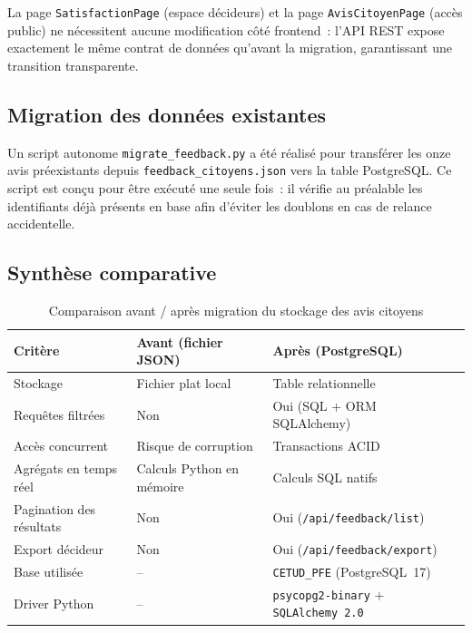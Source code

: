La page \texttt{SatisfactionPage} (espace d\'ecideurs) et la page \texttt{AvisCitoyenPage} (acc\`es public) ne n\'ecessitent aucune modification c\^ot\'e frontend~: l'API REST expose exactement le m\^eme contrat de donn\'ees qu'avant la migration, garantissant une transition transparente.

\subsection{Migration des donn\'ees existantes}

Un script autonome \texttt{migrate\_feedback.py} a \'et\'e r\'ealis\'e pour transf\'erer les onze avis pr\'eexistants depuis \texttt{feedback\_citoyens.json} vers la table PostgreSQL. Ce script est con\c{c}u pour \^etre ex\'ecut\'e une seule fois~: il v\'erifie au pr\'ealable les identifiants d\'ej\`a pr\'esents en base afin d'\'eviter les doublons en cas de relance accidentelle.

\subsection{Synth\`ese comparative}

\begin{table}[H]
\centering
\caption{Comparaison avant / apr\`es migration du stockage des avis citoyens}
\label{tab:feedback-avant-apres}
\begin{tabular}{|l|l|l|}
\hline
\textbf{Crit\`ere} & \textbf{Avant (fichier JSON)} & \textbf{Apr\`es (PostgreSQL)} \\
\hline
Stockage & Fichier plat local & Table relationnelle \\
Requ\^etes filtr\'ees & Non & Oui (SQL + ORM SQLAlchemy) \\
Acc\`es concurrent & Risque de corruption & Transactions ACID \\
Agr\'egats en temps r\'eel & Calculs Python en m\'emoire & Calculs SQL natifs \\
Pagination des r\'esultats & Non & Oui (\texttt{/api/feedback/list}) \\
Export d\'ecideur & Non & Oui (\texttt{/api/feedback/export}) \\
Base utilis\'ee & -- & \texttt{CETUD\_PFE} (PostgreSQL~17) \\
Driver Python & -- & \texttt{psycopg2-binary} + \texttt{SQLAlchemy~2.0} \\
\hline
\end{tabular}
\end{table}


